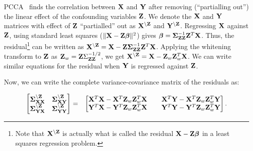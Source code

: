 \documentclass{llncs}
\newcommand{\X}{{\bf X}}
\newcommand{\Y}{{\bf Y}}
\newcommand{\Z}{{\bf Z}}
\newcommand{\bs}{\boldsymbol}
\newcommand{\bSigma}{\boldsymbol \Sigma}
\begin{document}
PCCA~\cite{timm} finds the correlation between $\X$ and $\Y$ after removing (``partialling out'') the linear effect of the confounding variables $\Z$. 
We denote the $\X$ and $\Y$ matrices with effect of $\Z$ ``partialled'' out as $\X^{\backslash\Z}$ and $\Y^{\backslash\Z}$. Regressing $\X$ against $\Z$, using standard least squares ($\|\X -\Z\bs\beta\|^2$) gives $\bs\beta=  \bs\Sigma_{\Z\Z}^{-1}\Z^T\X$. 
Thus, the residual\footnote{Note that $\X^{\backslash\Z}$ is actually what is called the residual $\X-\Z\bs\beta$ in a least squares regression problem.} can be written as  $\X^{\backslash\Z}=\X - \Z\bs\Sigma_{\Z\Z}^{-1}\Z^T\X$. Applying the whitening transform to $\Z$  as $\Z_w =\Z \Sigma_{\Z\Z}^{-1/2}$, we get $\X^{\backslash\Z}=\X - \Z_w\Z_w^T\X$.
We can write similar equations for the residual when $\Y$ is regressed against $\Z$.
 
Now, we can write the complete variance-covariance matrix of the residuals as:

\begin{eqnarray}
\label{matrices}
\begin{bmatrix}
 \bs\Sigma_{\X\X}^{\backslash \Z} & \bs\Sigma_{\X\Y}^{\backslash \Z} \\
  \bs\Sigma_{\Y\X}^{\backslash \Z} & \bs\Sigma_{\Y\Y}^{\backslash \Z} 
\end{bmatrix}
&=&
\begin{bmatrix}
  \X^T\X -\X^T \Z_w\Z_w^T\X &\;\;\;\;   \X^T\Y -\X^T \Z_w\Z_w^T\Y\\
  \Y^T\X -\Y^T \Z_w\Z_w^T\X &\;\;\;\;   \Y^T\Y -\Y^T \Z_w\Z_w^T\Y
\end{bmatrix}
.
\end{eqnarray}



\end{document}
